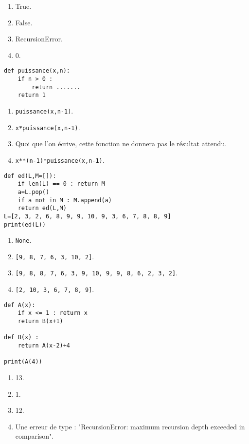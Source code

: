 \begin{enumerate}
\item True.
\item False. %
\item RecursionError.
\item 0.
\end{enumerate}

\begin{lstlisting}
def puissance(x,n):
    if n > 0 : 
        return .......
    return 1
\end{lstlisting}

\begin{enumerate}
\item \texttt{puissance(x,n-1)}.
\item \texttt{x*puissance(x,n-1)}. %
\item Quoi que l'on écrive, cette fonction ne donnera pas le résultat attendu.
\item \texttt{x**(n-1)*puissance(x,n-1)}.
\end{enumerate}

\begin{lstlisting}
def ed(L,M=[]):
    if len(L) == 0 : return M
    a=L.pop()
    if a not in M : M.append(a)
    return ed(L,M)
L=[2, 3, 2, 6, 8, 9, 9, 10, 9, 3, 6, 7, 8, 8, 9]
print(ed(L))
\end{lstlisting}

\begin{enumerate}
\item \texttt{None}.
\item \texttt{[9, 8, 7, 6, 3, 10, 2]}. %
\item \texttt{[9, 8, 8, 7, 6, 3, 9, 10, 9, 9, 8, 6, 2, 3, 2]}.
\item \texttt{[2, 10, 3, 6, 7, 8, 9]}.
\end{enumerate}

\begin{lstlisting}
def A(x):
    if x <= 1 : return x
    return B(x+1)

def B(x) :
    return A(x-2)+4

print(A(4))
\end{lstlisting}

\begin{enumerate}
\item 13. %
\item 1.
\item 12.
\item Une erreur de type : "RecursionError: maximum recursion depth exceeded in comparison".
\end{enumerate}
